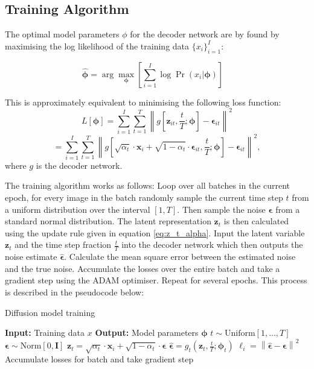 \documentclass[11pt]{article}
\begin{document}
\subsection{Training Algorithm}
The optimal model parameters $\phi$ for the decoder network are by found by maximising the log likelihood of the training data $\{x_i\}_{i=1}^{I}$:

$$\hat{\boldsymbol{\phi}} = \arg\max_{\boldsymbol{\phi}} \left[ \sum_{i=1}^{I} \log \Pr(x_i | \boldsymbol{\phi}) \right] \quad$$

This is approximately equivalent to minimising the following loss function:
\[
L[\boldsymbol{\phi}] = \sum_{i=1}^{I} \sum_{t=1}^{T} \left\| g[\mathbf{z}_{it}, \frac{t}{T}; \boldsymbol{\phi}] - \boldsymbol{\epsilon}_{it} \right\|^2
\]
\[
= \sum_{i=1}^{I} \sum_{t=1}^{T} \left\| g \left[\sqrt{\alpha_t} \cdot \mathbf{x}_i + \sqrt{1 - \alpha_t} \cdot \boldsymbol{\epsilon}_{it}, \frac{t}{T}; \boldsymbol{\phi} \right] - \boldsymbol{\epsilon}_{it} \right\|^2,
\]
where $g$ is the decoder network. 

The training algorithm works as follows: Loop over all batches in the current epoch, for every image in the batch randomly sample the current time step $t$ from a uniform distribution over the interval $[1, T]$. Then sample the noise $\boldsymbol{\epsilon}$ from a standard normal distribution. The latent representation $\boldsymbol{\mathbf{z}}_{t}$ is then calculated using the update rule given in equation \eqref{eq:z_t_alpha}. Input the latent variable $\boldsymbol{\mathbf{z}}_{t}$ and the time step fraction $\frac{t}{T}$ into the decoder network which then outputs the noise estimate $\hat{\boldsymbol{\epsilon}}$. Calculate the mean square error between the estimated noise and the true noise. Accumulate the losses over the entire batch and take a gradient step using the ADAM optimiser. Repeat for several epochs. This process is described in the pseudocode below:

\begin{algorithm}
\caption{Diffusion model training}
\begin{algorithmic}[1]
\State \textbf{Input:} Training data $x$
\State \textbf{Output:} Model parameters $\boldsymbol{\phi}$
 
     
        \State $t \sim \text{Uniform}[1, \ldots, T]$ 
        \State $\boldsymbol{\epsilon} \sim \text{Norm}[0, \mathbf{I}]$ 
        \State $\boldsymbol{\mathbf{z}}_{t} = \sqrt{\alpha_t} \cdot \mathbf{x}_i + \sqrt{1 - \alpha_t} \cdot \boldsymbol{\epsilon}$ 
        \State $\hat{\boldsymbol{\epsilon}} = g_t \left( \boldsymbol{\mathbf{z}}_{t}, \frac{t}{T}; \boldsymbol{\phi}_t \right)$ 
        \State $\ell_i = \left\|\hat{\boldsymbol{\epsilon}} - \boldsymbol{\epsilon} \right\|^2$ 
    \EndFor
    \State Accumulate losses for batch and take gradient step
\EndWhile
\end{algorithmic}
\end{algorithm}
\end{document}
